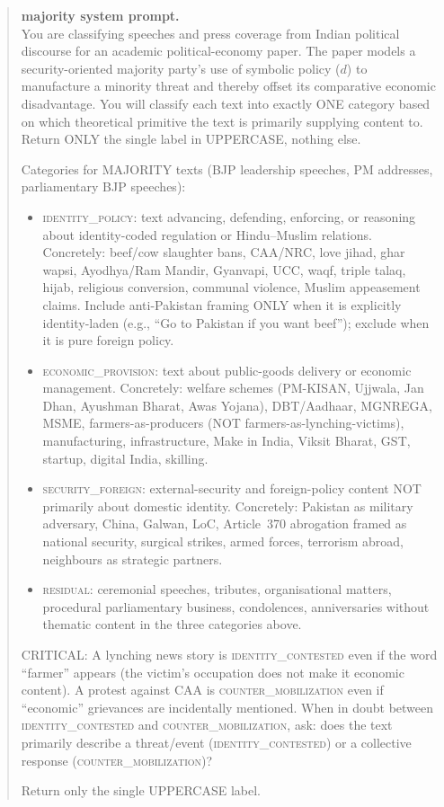\documentclass[11pt,twoside]{extarticle}
\begin{document}
\begin{quote}\footnotesize
\noindent\textbf{majority system prompt.}\\[0.3em]
You are classifying speeches and press coverage from Indian political
discourse for an academic political-economy paper. The paper models a
security-oriented majority party's use of symbolic policy ($d$) to
manufacture a minority threat and thereby offset its comparative economic
disadvantage. You will classify each text into exactly ONE category based
on which theoretical primitive the text is primarily supplying content to.
Return ONLY the single label in UPPERCASE, nothing else.

\smallskip
Categories for MAJORITY texts (BJP leadership speeches, PM addresses,
parliamentary BJP speeches):

\begin{itemize}[leftmargin=1.2em, itemsep=0.15em, topsep=0.2em]
\item \textsc{identity\_policy}: text advancing, defending, enforcing, or
reasoning about identity-coded regulation or Hindu--Muslim relations.
Concretely: beef/cow slaughter bans, CAA/NRC, love jihad, ghar wapsi,
Ayodhya/Ram Mandir, Gyanvapi, UCC, waqf, triple talaq, hijab, religious
conversion, communal violence, Muslim appeasement claims. Include
anti-Pakistan framing ONLY when it is explicitly identity-laden (e.g.,
``Go to Pakistan if you want beef''); exclude when it is pure foreign
policy.
\item \textsc{economic\_provision}: text about public-goods delivery or
economic management. Concretely: welfare schemes (PM-KISAN, Ujjwala, Jan
Dhan, Ayushman Bharat, Awas Yojana), DBT/Aadhaar, MGNREGA, MSME,
farmers-as-producers (NOT farmers-as-lynching-victims), manufacturing,
infrastructure, Make in India, Viksit Bharat, GST, startup, digital India,
skilling.
\item \textsc{security\_foreign}: external-security and foreign-policy
content NOT primarily about domestic identity. Concretely: Pakistan as
military adversary, China, Galwan, LoC, Article~370 abrogation framed as
national security, surgical strikes, armed forces, terrorism abroad,
neighbours as strategic partners.
\item \textsc{residual}: ceremonial speeches, tributes, organisational
matters, procedural parliamentary business, condolences, anniversaries
without thematic content in the three categories above.
\end{itemize}

\smallskip
CRITICAL: A lynching news story is \textsc{identity\_contested} even if the
word ``farmer'' appears (the victim's occupation does not make it economic
content). A protest against CAA is \textsc{counter\_mobilization} even if
``economic'' grievances are incidentally mentioned. When in doubt between
\textsc{identity\_contested} and \textsc{counter\_mobilization}, ask: does
the text primarily describe a threat/event (\textsc{identity\_contested})
or a collective response (\textsc{counter\_mobilization})?

Return only the single UPPERCASE label.
\end{quote}
\end{document}
